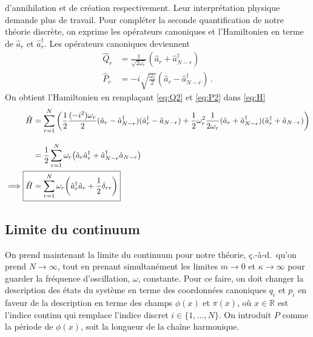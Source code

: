 \documentclass{article}
\numberwithin{equation}{section}
\theoremstyle{solution}
\begin{document}
d'annihilation et de création respectivement. Leur interprétation physique demande plus de travail.
Pour compléter la seconde quantification de notre théorie discrète, on exprime les opérateurs canoniques et l'Hamiltonien en terme de $\hat{a}_r$ et $\hat{a}^{\dagger}_r$. 
Les opérateurs canoniques deviennent
\begin{align}
        \label{eq:Q2}
        \hat{Q}_r &= \frac{1}{\sqrt{2 \omega_r}} (\hat{a}_r + \hat{a}^{\dagger}_{N-r}) \\[2ex]
        \label{eq:P2}
        \hat{P}_r &= -i\sqrt{\frac{ \omega_r}{2}} (\hat{a}_r - \hat{a}^{\dagger}_{N-r})\, .
\end{align} 
On obtient l'Hamiltonien en remplaçant \eqref{eq:Q2} et \eqref{eq:P2} dans \eqref{eq:H}
\begin{align*}
        \hat{H} 
        &= \sum_{r=1}^N \bigg(\frac{1}{2}\frac{(-i^2)\omega_r}{2}(\hat{a}_r - \hat{a}^{\dagger}_{N-r})(\hat{a}^{\dagger}_r - \hat{a}_{N-r}) 
        +\frac{1}{2}\omega_r^{2}\frac{1}{2 \omega_r}(\hat{a}_r + \hat{a}^{\dagger}_{N-r})(\hat{a}^{\dagger}_r + \hat{a}_{N-r})\bigg) \\[2ex]
         &= \frac{1}{2}\sum_{r=1}^N \omega_r\big( \hat{a}_r \hat{a}^{\dagger}_r + \hat{a}^{\dagger}_{N-r}\hat{a}_{N-r}\big) \\
         \implies \Aboxed{ \hat{H}   &= \sum_{r=1}^N \omega_r\bigg( \hat{a}_r^{\dagger} \hat{a}_r + \frac{1}{2}\delta_{rr}\bigg)}
\end{align*} 

\subsection{Limite du continuum}
On prend maintenant la limite du continuum pour notre théorie, ç.-à-d.~qu'on prend $N \rightarrow \infty $, tout en 
prenant simultanément les limites $m \rightarrow 0$ et $\kappa \rightarrow \infty $ pour guarder la fréquence d'oscillation, $\omega$, constante.
Pour ce faire, on doit changer la description des états du système en terme des coordonnées canoniques $q_i$ et $p_i$ 
en faveur de la description en terme des champs $\phi(x)$ et $\pi(x)$, où $x \in \mathbb{R}$ est l'indice continu qui remplace l'indice discret $i \in \{1,\dots,N\}$. 
On introduit $P$ comme la période de $\phi(x)$, soit la longueur de la chaîne harmonique.
\end{document}
